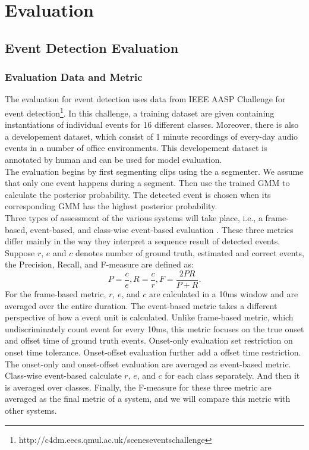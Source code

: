 \chapter{Evaluation}

\section{Event Detection Evaluation}
\subsection{Evaluation Data and Metric}
The evaluation for event detection uses data from IEEE AASP Challenge for event detection\footnote{http://c4dm.eecs.qmul.ac.uk/sceneseventschallenge}.  
In this challenge, a training dataset are given containing instantiations of individual events for 16 different classes. 
Moreover, there is also a developement dataset, which consist of 1 minute recordings of every-day audio events in a number of office environments. 
This developement dataset is annotated by human and can be used for model evaluation. \\ 

The evaluation begins by first segmenting clips using the a segmenter. 
We assume that only one event happens during a segment. 
Then use the trained GMM to calculate the posterior probability. 
The detected event is chosen when its corresponding GMM has the highest posterior probability.\\ 
 
Three types of assessment of the various systems will take place, i.e., a frame-based, event-based, and class-wise event-based evaluation \cite{giannoulis2013database}.  These three metrics differ mainly in the way they interpret a sequence result of detected events.  
Suppose $r$, $e$ and $c$ denotes number of ground truth, estimated and correct events, the Precision, Recall, and F-measure are defined as: 
\begin{equation}
	P = \frac{c}{e}, R = \frac{c}{r}, F = \frac{2PR}{P+R}.  
\end{equation}
For the frame-based metric, $r$, $e$, and $c$ are calculated in a 10ms window and are averaged over the entire duration. 
The event-based metric takes a different perspective of how a event unit is calculated. 
Unlike frame-based metric, which undiscriminately count event for every 10ms, this metric focuses on the true onset and offset time of ground truth events. 
Onset-only evaluation set restriction on onset time tolerance. 
Onset-offset evaluation further add a offset time restriction. 
The onset-only and onset-offset evaluation are averaged as event-based metric. 
Class-wise event-based calculate $r$, $e$, and $c$ for each class separately. And then it is averaged over classes. 
Finally, the F-measure for these three metric are averaged as the final metric of a system, and we will compare this metric with other systems. 

